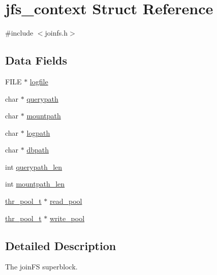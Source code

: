 \hypertarget{structjfs__context}{
\section{jfs\_\-context Struct Reference}
\label{structjfs__context}
}


{\ttfamily \#include $<$joinfs.h$>$}

\subsection*{Data Fields}
\begin{DoxyCompactItemize}
\item 
FILE $\ast$ \hyperlink{structjfs__context_a56a037d2db7ac28aef025ac0a24a210e}{logfile}
\item 
char $\ast$ \hyperlink{structjfs__context_a67f036982dd208c903bb0ef7e2d18894}{querypath}
\item 
char $\ast$ \hyperlink{structjfs__context_adcf87cdd6e1b9172e8379742c858e583}{mountpath}
\item 
char $\ast$ \hyperlink{structjfs__context_aec391a1656ed91a493333bb0a06bb788}{logpath}
\item 
char $\ast$ \hyperlink{structjfs__context_a8f4217519412c4a747d62dd4180dc4a6}{dbpath}
\item 
int \hyperlink{structjfs__context_a2e1a836c640ab2e62aad24469acbf599}{querypath\_\-len}
\item 
int \hyperlink{structjfs__context_a4f819b63c7abd6d48eaa8aee3963b741}{mountpath\_\-len}
\item 
\hyperlink{structthr__pool}{thr\_\-pool\_\-t} $\ast$ \hyperlink{structjfs__context_a407aea616bfd6fae32ef4e4a8adffa7a}{read\_\-pool}
\item 
\hyperlink{structthr__pool}{thr\_\-pool\_\-t} $\ast$ \hyperlink{structjfs__context_af6a489c5b07ac7edac9e7c9c8394bfe1}{write\_\-pool}
\end{DoxyCompactItemize}


\subsection{Detailed Description}
The joinFS superblock. 

